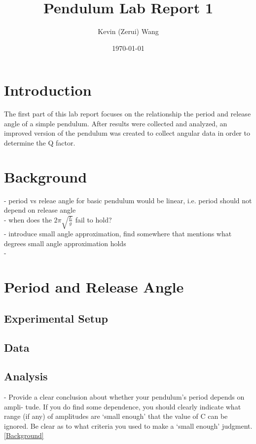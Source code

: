 \documentclass[12pt]{article}
\title{Pendulum Lab Report 1}
\author{Kevin (Zerui) Wang}
\date{\today}
\begin{document}

\maketitle


\section{Introduction}
The first part of this lab report focuses on the relationship the period and release angle of a simple pendulum. After results were collected and analyzed, an improved version of the pendulum was created to collect angular data in order to determine the Q factor.

\section*{Background} \label{Background}
- period vs releae angle for basic pendulum would be linear, i.e. period should not depend on release angle \\
- when does the $2\pi\sqrt{\frac{L}{g}}$ fail to hold? \\
- introduce small angle approximation, find somewhere that mentions what degrees small angle approximation holds \\
-


\section{Period and Release Angle}



\subsection{Experimental Setup}
\subsection{Data}
\subsection{Analysis}
- Provide a clear conclusion about whether your pendulum's period depends on ampli- tude. If you do find some dependence, you should clearly indicate what range (if any) of amplitudes are `small enough' that the value of C can be ignored. Be clear as to what criteria you used to make a `small enough' judgment. \ref*{Background}
\end{document}
